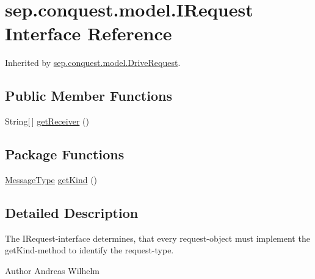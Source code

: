 \hypertarget{interfacesep_1_1conquest_1_1model_1_1_i_request}{
\section{sep.conquest.model.IRequest Interface Reference}
\label{interfacesep_1_1conquest_1_1model_1_1_i_request}
}


Inherited by \hyperlink{classsep_1_1conquest_1_1model_1_1_drive_request}{sep.conquest.model.DriveRequest}.

\subsection*{Public Member Functions}
\begin{DoxyCompactItemize}
\item 
String\mbox{[}$\,$\mbox{]} \hyperlink{interfacesep_1_1conquest_1_1model_1_1_i_request_a347a4e91ba0f7edb895805eeb014a28f}{getReceiver} ()
\end{DoxyCompactItemize}
\subsection*{Package Functions}
\begin{DoxyCompactItemize}
\item 
\hyperlink{namespacesep_1_1conquest_1_1model_a9d4115ef068e2fe4bc233f43008aa095}{MessageType} \hyperlink{interfacesep_1_1conquest_1_1model_1_1_i_request_a3fa93a9e1e87cb8d6169cc51db03887a}{getKind} ()
\end{DoxyCompactItemize}


\subsection{Detailed Description}
The IRequest-\/interface determines, that every request-\/object must implement the getKind-\/method to identify the request-\/type.

\begin{DoxyAuthor}{Author}
Andreas Wilhelm 
\end{DoxyAuthor}


